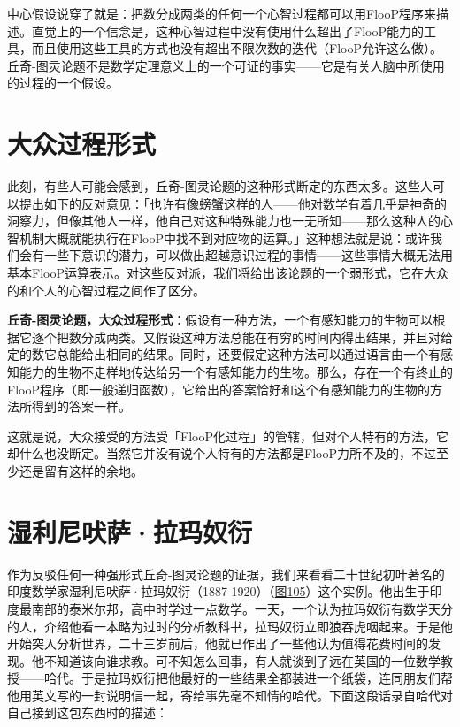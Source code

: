 \documentclass[
  12pt,
  twoside,
  openright,
  oldfontcommands,
]{memoir}
\newcommand{\heititext}[1]{{\heifamily\bfseries #1}}
\begin{document}
中心假设说穿了就是：把数分成两类的任何一个心智过程都可以用FlooP程序来描述。直觉上的一个信念是，这种心智过程中没有使用什么超出了FlooP能力的工具，而且使用这些工具的方式也没有超出不限次数的迭代（FlooP允许这么做）。丘奇-图灵论题不是数学定理意义上的一个可证的事实------它是有关人脑中所使用的过程的一个假设。

\section{大众过程形式}

此刻，有些人可能会感到，丘奇-图灵论题的这种形式断定的东西太多。这些人可以提出如下的反对意见：「也许有像螃蟹这样的人------他对数学有着几乎是神奇的洞察力，但像其他人一样，他自己对这种特殊能力也一无所知------那么这种人的心智机制大概就能执行在FlooP中找不到对应物的运算。」这种想法就是说：或许我们会有一些下意识的潜力，可以做出超越意识过程的事情------这些事情大概无法用基本FlooP运算表示。对这些反对派，我们将给出该论题的一个弱形式，它在大众的和个人的心智过程之间作了区分。

\heititext{丘奇-图灵论题，大众过程形式}：假设有一种方法，一个有感知能力的生物可以根据它逐个把数分成两类。又假设这种方法总能在有穷的时间内得出结果，并且对给定的数它总能给出相同的结果。同时，还要假定这种方法可以通过语言由一个有感知能力的生物不走样地传达给另一个有感知能力的生物。那么，存在一个有终止的FlooP程序（即一般递归函数），它给出的答案恰好和这个有感知能力的生物的方法所得到的答案一样。

这就是说，大众接受的方法受「FlooP化过程」的管辖，但对个人特有的方法，它却什么也没断定。当然它并没有说个人特有的方法都是FlooP力所不及的，不过至少还是留有这样的余地。

\section{湿利尼吠萨·拉玛奴衍}

作为反驳任何一种强形式丘奇-图灵论题的证据，我们来看看二十世纪初叶著名的印度数学家湿利尼吠萨·拉玛奴衍（1887-1920）（\hyperref[fig:105]{图105}）这个实例。他出生于印度最南部的泰米尔邦，高中时学过一点数学。一天，一个认为拉玛奴衍有数学天分的人，介绍他看一本略为过时的分析教科书，拉玛奴衍立即狼吞虎咽起来。于是他开始突入分析世界，二十三岁前后，他就已作出了一些他认为值得花费时间的发现。他不知道该向谁求教。可不知怎么回事，有人就谈到了远在英国的一位数学教授------哈代。于是拉玛奴衍把他最好的一些结果全都装进一个纸袋，连同朋友们帮他用英文写的一封说明信一起，寄给事先毫不知情的哈代。下面这段话录自哈代对自己接到这包东西时的描述：
\end{document}
